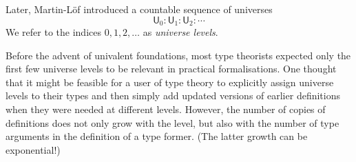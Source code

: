 \documentclass[11pt,a4paper]{article}
\theoremstyle{definition}
\newcommand{\UU}{\mathsf{U}}
\newcommand{\ttt}[1]{\text{\tt #1}}
\begin{document}

Later, Martin-L\"of \cite{martinlof:predicative} introduced a countable sequence of universes
$$
\UU_0 : \UU_1 : \UU_2 : \cdots
$$
We refer to the indices $0, 1, 2, \ldots$ as {\em universe levels}.

Before the advent of univalent foundations, most type theorists expected 
only the first few universe levels to be relevant in practical formalisations. 
One thought that it might be feasible for a user of 
type theory to explicitly assign universe levels to their types and 
then simply add updated versions of earlier
definitions when they were needed at different levels.
However, the number of copies of definitions does not only grow with the level, 
but also with the number of type arguments in the definition of a type former. 
(The latter growth can be exponential!)
\end{document}
